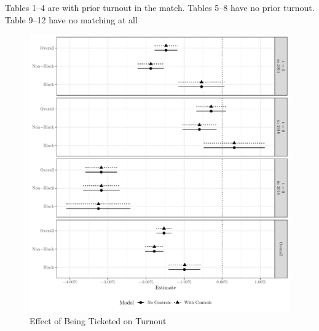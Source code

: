 \documentclass[
  12pt,
]{article}
\begin{document}
Tables 1--4 are with prior turnout in the match. Tables 5--8 have no prior turnout. Table 9--12 have no matching at all

\begin{singlespace}








 





\end{singlespace}

\begin{figure}[H]

{\centering \includegraphics{compile_files/figure-latex/coef-plot-primary-1} 

}

\caption{\label{fig:did-1}Effect of Being Ticketed on Turnout}\label{fig:coef-plot-primary}
\end{figure}
\end{document}

